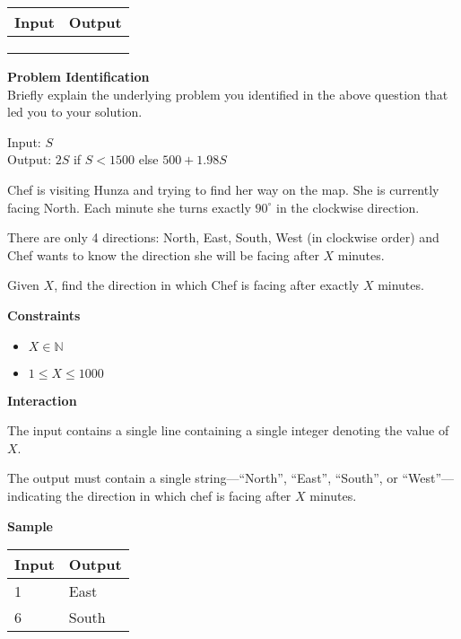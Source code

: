 \documentclass[a4paper]{exam}
\newcommand\heading[1]{\textbf{#1}}
\newcommand\inn{\in \mathbb{N}}
\begin{document}
\begin{questions}
    \begin{tabularx}{\textwidth}{|X|X|}
        \rowcolor{gray!50}
        \hline
        Input & Output \\ \hline\hline
              &        \\\hline
              &        \\\hline
              &        \\\hline
    \end{tabularx}


    \heading{Problem Identification}\\
    Briefly explain the underlying problem you identified in the above question that led you to your solution.

  \begin{mdframed}
    Input: $S$\\
    Output: $2S$ if $S<1500$ else $500+1.98S$
  \end{mdframed}


    Chef is visiting Hunza and trying to find her way on the map. She is currently facing North. Each minute she turns exactly $90^\circ$ in the clockwise direction.

    There are only 4 directions: North, East, South, West (in clockwise order) and Chef wants to know the direction she will be facing after $X$ minutes. 

    Given $X$, find the direction in which Chef is facing after exactly $X$ minutes.

    \heading{Constraints}
    \begin{itemize}
        \item $X \inn$
        \item $1 \le X \le 1000$
    \end{itemize}


    \heading{Interaction}

    The input contains a single line containing a single integer denoting the value of $X$.

    The output must contain a single string---``North'', ``East'', ``South'', or ``West''---indicating the direction in which chef is facing after $X$ minutes.

    \heading{Sample}

    \begin{tabularx}{\textwidth}{|X|X|}
        \rowcolor{gray!50}
        \hline
        Input & Output \\ \hline\hline
        1     & East   \\\hline
        6     & South  \\\hline
    \end{tabularx}


\end{questions}
\end{document}
